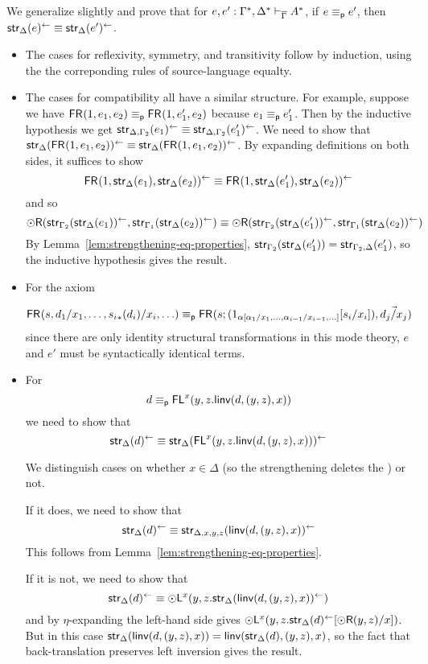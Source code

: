 \begin{enumerate}
We generalize slightly and prove that for 
$e,e' : \Gamma^*,\Delta^* \vdash_{\overline{\Gamma}} A^*$, 
if $e \equiv_{\mathsf{p}} e'$, then $\mathsf{str}_{\Delta}(e)^{\leftarrow} \equiv \mathsf{str}_{\Delta}(e')^{\leftarrow}$.

\begin{itemize}

\item The cases for reflexivity, symmetry, and transitivity follow by
  induction, using the the correponding rules of source-language
  equalty.

\item The cases for compatibility all have a similar structure.  For
  example, suppose we have $\mathsf{FR}_{}(1,e_1,e_2) \equiv_{\mathsf{p}}
  \mathsf{FR}_{}(1,e_1',e_2)$ because $e_1 \equiv_{\mathsf{p}} e_1'$.
  Then by the inductive
  hypothesis we get $\mathsf{str}_{\Delta,\Gamma_2}(e_1)^{\leftarrow} \equiv
  \mathsf{str}_{\Delta,\Gamma_2}(e_1')^{\leftarrow}$.
  We need to show that $\mathsf{str}_{\Delta}(\mathsf{FR}_{}(1,e_1,e_2))^{\leftarrow} \equiv 
  \mathsf{str}_{\Delta}(\mathsf{FR}_{}(1,e_1,e_2))^{\leftarrow}$.  By expanding definitions
  on both sides, it suffices to show
  \[
    \mathsf{FR}_{}(1,\mathsf{str}_{\Delta}(e_1),\mathsf{str}_{\Delta}(e_2))^{\leftarrow}
    \equiv 
    \mathsf{FR}_{}(1,\mathsf{str}_{\Delta}(e_1'),\mathsf{str}_{\Delta}(e_2))^{\leftarrow}
  \]
  and so
  \[
    \mathord{\odot}\mathsf{R}(\mathsf{str}_{\Gamma_2}(\mathsf{str}_{\Delta}(e_1))^{\leftarrow},\mathsf{str}_{\Gamma_1}(\mathsf{str}_{\Delta}(e_2))^{\leftarrow})
    \equiv 
    \mathord{\odot}\mathsf{R}(\mathsf{str}_{\Gamma_2}(\mathsf{str}_{\Delta}(e_1'))^{\leftarrow},\mathsf{str}_{\Gamma_1}(\mathsf{str}_{\Delta}(e_2))^{\leftarrow})
  \]
  By Lemma~\ref{lem:strengthening-eq-properties}, ${\mathsf{str}_{\Gamma_2}(\mathsf{str}_{\Delta}(e_1'))} =
  {\mathsf{str}_{\Gamma_2,\Delta}(e_1')}$, so the inductive hypothesis gives the
  result.

\item For the axiom

\[
\mathsf{FR}_{}(s,d_1/x_1,\ldots,{s_i}_*(d_i)/x_i,\ldots) \equiv_{\mathsf{p}} \mathsf{FR}_{}(s;(1_{\alpha[\alpha_1/x_1,\ldots,\alpha_{i-1}/x_{i-1},\ldots]}[s_i/x_i]),\vec{d_j/x_j})\\
\]
since there are only identity structural transformations in this mode
theory, $e$ and $e'$ must be syntactically identical terms.

\item For 
\[
d \equiv_{\mathsf{p}} \mathsf{FL}^{x}(y,z.\mathsf{linv}(d,(y,z),x))
\]
we need to show that
\[
\mathsf{str}_{\Delta}(d)^{\leftarrow}
\equiv 
\mathsf{str}_{\Delta}(\mathsf{FL}^{x}(y,z.\mathsf{linv}(d,(y,z),x)))^{\leftarrow}
\]

We distinguish cases on whether $x \in \Delta$ (so the strengthening
deletes the \FL) or not.

If it does, we need to show that 
\[
\mathsf{str}_{\Delta}(d)^{\leftarrow}
\equiv 
\mathsf{str}_{\Delta,x,y,z}(\mathsf{linv}(d,(y,z),x))^{\leftarrow}
\]
This follows from Lemma~\ref{lem:strengthening-eq-properties}.  

If it is not, we need to show that 
\[
\mathsf{str}_{\Delta}(d)^{\leftarrow}
\equiv 
\mathord{\odot}\mathsf{L}^{x}(y,z.\mathsf{str}_{\Delta}(\mathsf{linv}(d,(y,z),x))^{\leftarrow})
\]
and by $\eta$-expanding the left-hand side gives
$\mathord{\odot}\mathsf{L}^{x}(y,z.\mathsf{str}_{\Delta}(d)^{\leftarrow}[\mathord{\odot}\mathsf{R}(y,z)/x])$.
But in this case 
$\mathsf{str}_{\Delta}(\mathsf{linv}(d,(y,z),x)) = \mathsf{linv}(\mathsf{str}_{\Delta}(d),(y,z),x)$,
so the fact that back-translation preserves left inversion gives the
result.  

\end{itemize}

\end{enumerate}
